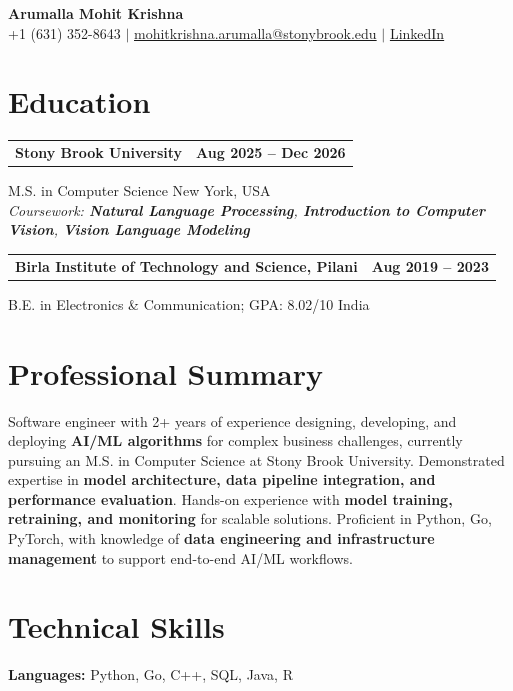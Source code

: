 \documentclass[letterpaper,10pt]{article}
\makeatletter
\newcommand{\entry}[2]{%
  \noindent
  \begin{tabularx}{\linewidth}
    {@{}>{\raggedright\arraybackslash}X@{\hspace{6pt}}r@{}}
    \textbf{#1} & #2
  \end{tabularx}\par
}
\makeatother
\begin{document}
\begin{center}
    {\LARGE\bfseries Arumalla Mohit Krishna}\\[3pt]
    +1 (631) 352-8643 $|$
    \href{mailto:mohitkrishna.arumalla@stonybrook.edu}
    {mohitkrishna.arumalla@stonybrook.edu} $|$
    \href{https://linkedin.com/in/mohit-krishna-arumalla}
    {LinkedIn}
\end{center}
\vspace{-8pt}

\section{Education}

\entry
  {\textbf{Stony Brook University}}
  {\textbf{Aug 2025 -- Dec 2026}}

M.S. in Computer Science \hfill New York, USA\\
\textit{
Coursework: \textbf{Natural Language Processing},
\textbf{Introduction to Computer Vision}, \textbf{Vision Language Modeling}
}
\vspace{3pt}

\entry
  {\textbf{Birla Institute of Technology and Science, Pilani}}
  {\textbf{Aug 2019 -- 2023}}

B.E. in Electronics \& Communication; GPA: 8.02/10 \hfill India
\section{Professional Summary}

Software engineer with 2+ years of experience designing, developing, and deploying \textbf{AI/ML algorithms} for complex business challenges,
currently pursuing an M.S. in Computer Science at Stony Brook University.
Demonstrated expertise in \textbf{model architecture, data pipeline integration, and performance evaluation}.
Hands-on experience with \textbf{model training, retraining, and monitoring} for scalable solutions.
Proficient in Python, Go, PyTorch, with knowledge of \textbf{data engineering and infrastructure management} to support end-to-end AI/ML workflows.

\section{Technical Skills}

\textbf{Languages:}
Python, Go, C++, SQL, Java, R\\
\end{document}
